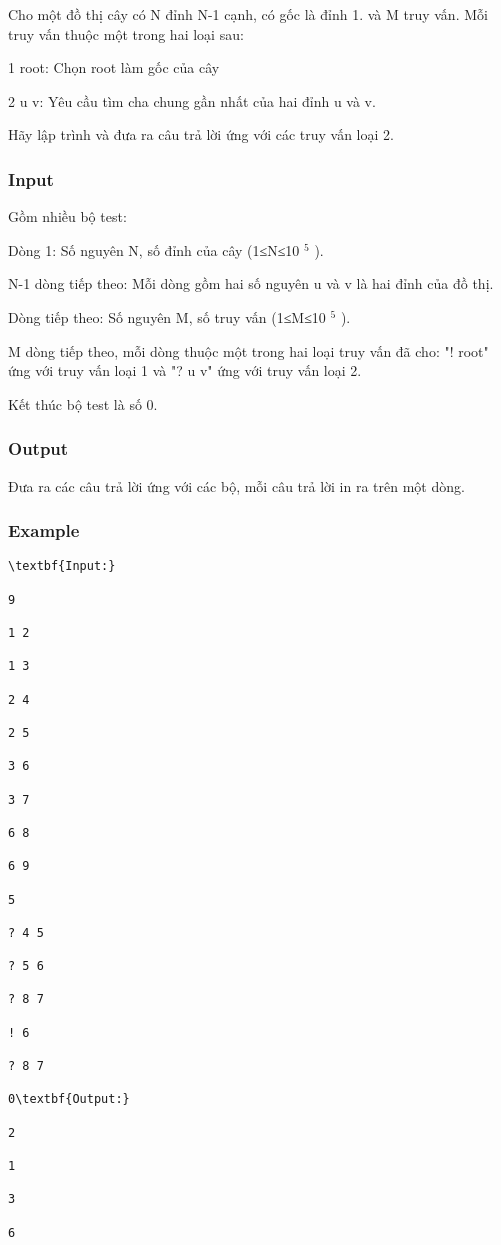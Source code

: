 



   Cho một đồ thị cây có N đỉnh N-1 cạnh, có gốc là đỉnh 1. và M truy vấn. Mỗi truy vấn thuộc một trong hai loại sau:  

   1 root: Chọn root làm gốc của cây  

   2 u v: Yêu cầu tìm cha chung gần nhất của hai đỉnh u và v.  

   Hãy lập trình và đưa ra câu trả lời ứng với các truy vấn loại 2.  

\subsubsection{   Input  }

   Gồm nhiều bộ test:  

   Dòng 1: Số nguyên N, số đỉnh của cây (1≤N≤10   $^    5   $   ).  

   N-1 dòng tiếp theo: Mỗi dòng gồm hai số nguyên u và v là hai đỉnh của đồ thị.  

   Dòng tiếp theo: Số nguyên M, số truy vấn (1≤M≤10   $^    5   $   ).  

   M dòng tiếp theo, mỗi dòng thuộc một trong hai loại truy vấn đã cho: "! root" ứng với truy vấn loại 1 và "? u v" ứng với truy vấn loại 2.  

   Kết thúc bộ test là số 0.  

\subsubsection{   Output  }

   Đưa ra các câu trả lời ứng với các bộ, mỗi câu trả lời in ra trên một dòng.  

\subsubsection{   Example  }
\begin{verbatim}
\textbf{Input:}

9

1 2

1 3

2 4

2 5

3 6

3 7

6 8

6 9

5

? 4 5

? 5 6

? 8 7

! 6

? 8 7

0\textbf{Output:}

2

1

3

6\end{verbatim}